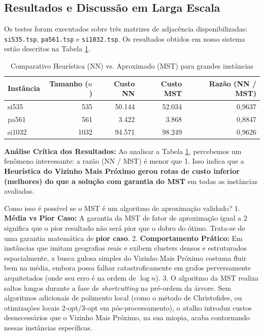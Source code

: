 \documentclass[12pt,a4paper]{article}
\begin{document}
\subsection{Resultados e Discussão em Larga Escala}

Os testes foram executados sobre três matrizes de adjacência disponibilizadas: \texttt{si535.tsp}, \texttt{pa561.tsp} e \texttt{si1032.tsp}. Os resultados obtidos em nosso sistema estão descritos na Tabela \ref{tab:heuristica}.

\begin{table}[H]
    \centering
    \caption{Comparativo Heurística (NN) vs. Aproximado (MST) para grandes instâncias}
    \label{tab:heuristica}
    \begin{tabular}{@{}lrrrr@{}}
    \toprule
    \textbf{Instância} & \textbf{Tamanho ($n$)} & \textbf{Custo NN} & \textbf{Custo MST} & \textbf{Razão (NN / MST)} \\ \midrule
    si535  & 535  & 50.144 & 52.034 & 0,9637 \\
    pa561  & 561  & 3.422  & 3.868  & 0,8847 \\
    si1032 & 1032 & 94.571 & 98.249 & 0,9626 \\ \bottomrule
    \end{tabular}
\end{table}

\textbf{Análise Crítica dos Resultados:}
Ao analisar a Tabela \ref{tab:heuristica}, percebemos um fenômeno interessante: a razão (NN / MST) é menor que 1. Isso indica que a \textbf{Heurística do Vizinho Mais Próximo gerou rotas de custo inferior (melhores) do que a solução com garantia do MST} em todas as instâncias avaliadas.

Como isso é possível se o MST é um algoritmo de aproximação validado?
1. \textbf{Média vs Pior Caso:} A garantia da MST de fator de aproximação igual a $2$ significa que o pior resultado não será pior que o dobro do ótimo. Trata-se de uma garantia matemática de \textbf{pior caso}.
2. \textbf{Comportamento Prático:} Em instâncias que imitam geografias reais e exibem clusters densos e estruturados espacialmente, a busca gulosa simples do Vizinho Mais Próximo costuma fluir bem na média, embora possa falhar catastroficamente em grafos perversamente arquitetados (onde seu erro é na ordem de $\log n$).
3. O algoritmo da MST realiza saltos longos durante a fase de \textit{shortcutting} na pré-ordem da árvore. Sem algoritmos adicionais de polimento local (como o método de Christofides, ou otimizações locais 2-opt/3-opt em pós-processamento), o atalho introduz custos desnecessários que o Vizinho Mais Próximo, na sua miopia, acaba contornando nessas instâncias específicas.
\end{document}
